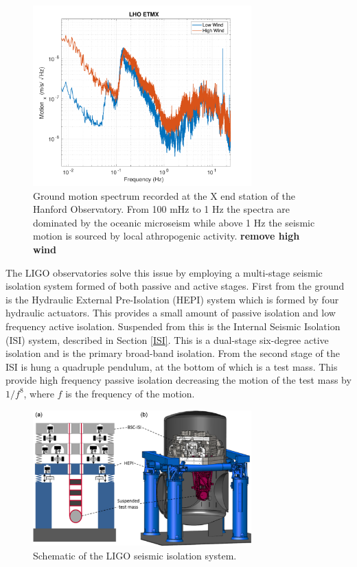 \documentclass [12pt, proquest]{uwthesis}[2019]
\begin{document}
\begin{figure}
\begin{center}
\includegraphics[width=0.75\textwidth]{windComp.pdf}
\caption[Ground motion spectrum]{Ground motion spectrum recorded at the X end station of the Hanford Observatory. From 100 mHz to 1 Hz the spectra are dominated by the oceanic microseism while above 1 Hz the seismic motion is sourced by local athropogenic activity. \textbf{remove high wind}}
\label{wind}
\end{center}
\end{figure}

The LIGO observatories solve this issue by employing a multi-stage seismic isolation system formed of both passive and active stages. First from the ground is the Hydraulic External Pre-Isolation (HEPI) system which is formed by four hydraulic actuators. This provides a small amount of passive isolation and low frequency active isolation. Suspended from this is the Internal Seismic Isolation (ISI) system, described in Section \ref{ISI}. This is a dual-stage six-degree active isolation and is the primary broad-band isolation. From the second stage of the ISI is hung a quadruple pendulum, at the bottom of which is a test mass. This provide high frequency passive isolation decreasing the motion of the test mass by $1/f^8$, where $f$ is the frequency of the motion.

\begin{figure}
\begin{center}
\includegraphics[width=0.75\textwidth]{seismicIso.jpg}
\caption[Schematic of the LIGO seismic isolation system]{Schematic of the LIGO seismic isolation system. \cite{ligoSeis}}
\label{wind}
\end{center}
\end{figure}
\end{document}
